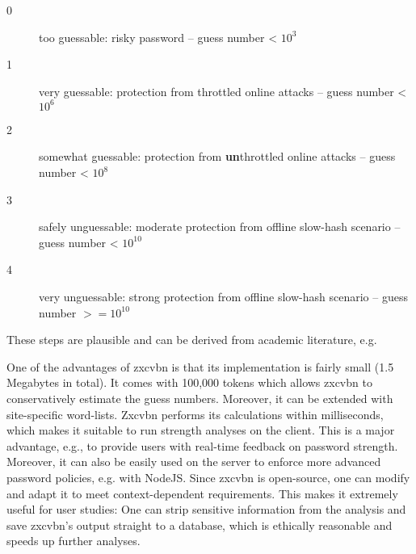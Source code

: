 	\begin{description}
		\item[0] too guessable: risky password -- guess number < $10^3$
		\item[1] very guessable: protection from throttled online attacks -- guess number < $10^6$
		\item[2] somewhat guessable: protection from \textbf{un}throttled online attacks -- guess number < $10^8$
		\item[3] safely unguessable: moderate protection from offline slow-hash scenario -- guess number < $10^{10}$
		\item[4] very unguessable: strong protection from offline slow-hash scenario -- guess number $>=10^{10}$
	\end{description} 

	These steps are plausible and can be derived from academic literature, e.g. \cite{Bonneau2012ScienceOfGuessing, Florencio2014AdministratorsGuide, Ur2015MeasuringRealWorldAccuracies, Wang2016fuzzyPWM}
	
	One of the advantages of zxcvbn is that its implementation is fairly small (1.5 Megabytes in total). It comes with 100,000 tokens which allows zxcvbn to conservatively estimate the guess numbers. Moreover, it can be extended with site-specific word-lists. Zxcvbn performs its calculations within milliseconds, which makes it suitable to run strength analyses on the client. This is a major advantage, e.g., to provide users with real-time feedback on password strength. Moreover, it can also be easily used on the server to enforce more advanced password policies, e.g. with NodeJS. Since zxcvbn is open-source, one can modify and adapt it to meet context-dependent requirements. This makes it extremely useful for user studies: One can strip sensitive information from the analysis and save zxcvbn's output straight to a database, which is ethically reasonable and speeds up further analyses. 

